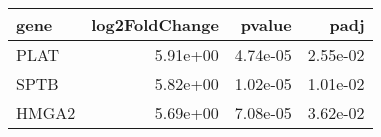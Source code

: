 \begin{tabular}{lrrr}
\toprule
 gene &  log2FoldChange &   pvalue &     padj \\
\midrule
 PLAT &        5.91e+00 & 4.74e-05 & 2.55e-02 \\
 SPTB &        5.82e+00 & 1.02e-05 & 1.01e-02 \\
HMGA2 &        5.69e+00 & 7.08e-05 & 3.62e-02 \\
\bottomrule
\end{tabular}
